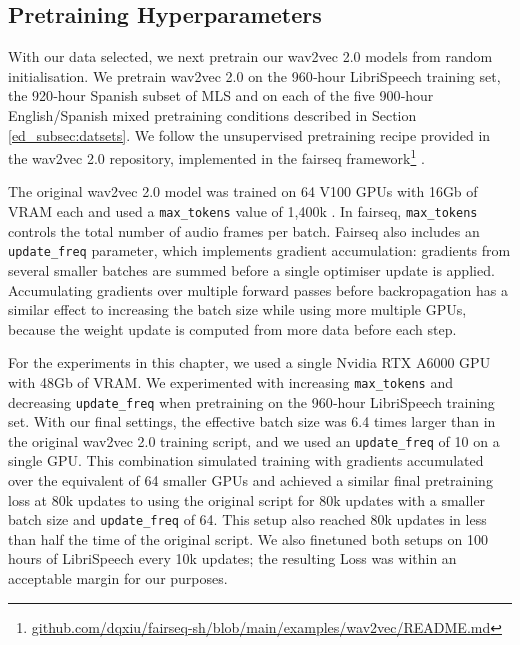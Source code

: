\subsection{Pretraining Hyperparameters} \label{ed_pretraining_configuration}
With our data selected, we next pretrain our wav2vec 2.0 models from random initialisation. We pretrain wav2vec 2.0 \cite{wav2vec} on the 960‑hour LibriSpeech training set, the 920‑hour Spanish subset of MLS and on each of the five 900‑hour English/Spanish mixed pretraining conditions described in Section \ref{ed_subsec:datsets}. We follow the unsupervised pretraining recipe provided in the wav2vec 2.0 repository, implemented in the fairseq framework\footnote{\href{https://github.com/dqxiu/fairseq-sh/blob/main/examples/wav2vec/README.md}{github.com/dqxiu/fairseq-sh/blob/main/examples/wav2vec/README.md}} \cite{ott-etal-2019-fairseq}.

The original wav2vec 2.0 model was trained on 64 V100 GPUs with 16Gb of VRAM each and used a \texttt{max\_tokens} value of 1,400k \cite{wav2vec}. In fairseq, \texttt{max\_tokens} controls the total number of audio frames per batch. Fairseq also includes an \texttt{update\_freq} parameter, which implements gradient accumulation: gradients from several smaller batches are summed before a single optimiser update is applied. Accumulating gradients over multiple forward passes before backropagation has a similar effect to increasing the batch size while using more multiple GPUs, because the weight update is computed from more data before each step.

For the experiments in this chapter, we used a single Nvidia RTX A6000 GPU with 48Gb of VRAM. We experimented with increasing \texttt{max\_tokens} and decreasing \texttt{update\_freq} when pretraining on the 960‑hour LibriSpeech training set. With our final settings, the effective batch size was 6.4 times larger than in the original wav2vec 2.0 training script, and we used an \texttt{update\_freq} of 10 on a single GPU. This combination simulated training with gradients accumulated over the equivalent of 64 smaller GPUs and achieved a similar final pretraining loss at 80k updates to using the original script for 80k updates with a smaller batch size and \texttt{update\_freq} of 64. This setup also reached 80k updates in less than half the time of the original script. We also finetuned both setups on 100 hours of LibriSpeech every 10k updates; the resulting Loss was within an acceptable margin for our purposes.

